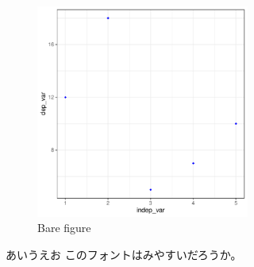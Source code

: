 \documentclass[12pt,a4paper]{article}
\begin{document}
\begin{figure}
\centering
\includegraphics[width=7cm]{../../../04_analyze/scatter_regress/figure/figure.pdf}

\label{fig:img1}
\caption{Bare figure}
\end{figure}


あいうえお
このフォントはみやすいだろうか。



\end{document}
